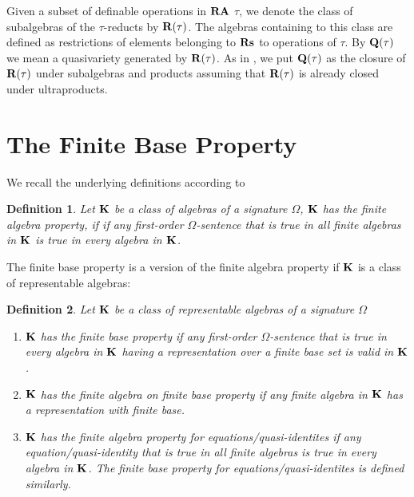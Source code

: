 \documentclass[a4paper]{article}
\theoremstyle{defin}
\newtheorem{defin}{Definition}
\theoremstyle{theorem}
\theoremstyle{prop}
\theoremstyle{lemma}
\theoremstyle{ex}
\theoremstyle{col}
\begin{document}

Given a subset of definable operations in ${\bf RA}$ $\tau$, we denote the class of subalgebras of the
$\tau$-reducts by ${\bf R}(\tau)$. The algebras containing to this class are defined as restrictions of
elements belonging to ${\bf Rs}$ to operations of $\tau$. By ${\bf Q}(\tau)$ we mean a quasivariety generated by ${\bf R}(\tau)$. As in \cite{hirsch2011positive}, we put ${\bf Q}(\tau)$ as the closure of ${\bf R}(\tau)$ under subalgebras and products assuming that ${\bf R}(\tau)$ is already closed under ultraproducts.

\section{The Finite Base Property}

We recall the underlying definitions according to \cite[Section 19]{hirsch2002relation}

\begin{defin}
  Let ${\bf K}$ be a class of algebras of a signature $\Omega$, ${\bf K}$ has the finite algebra property, if
  if any first-order $\Omega$-sentence that is true in all finite algebras in ${\bf K}$ is true in every algebra in ${\bf K}$.
\end{defin}

The finite base property is a version of the finite algebra property if ${\bf K}$ is a class of representable algebras:

\begin{defin}
Let ${\bf K}$ be a class of representable algebras of a signature $\Omega$

  \begin{enumerate}
  \item ${\bf K}$ has the finite base property if any first-order $\Omega$-sentence that is true in every algebra in ${\bf K}$ having a representation over a finite base set is valid in ${\bf K}$.
  \item ${\bf K}$ has the finite algebra on finite base property if any finite algebra in ${\bf K}$ has a representation with finite base.
  \item ${\bf K}$ has the finite algebra property for equations/quasi-identites if any equation/quasi-identity that is true in all finite algebras is true in every algebra in ${\bf K}$. The finite base property for equations/quasi-identites is defined similarly.
\end{enumerate}
\end{defin}
\end{document}
